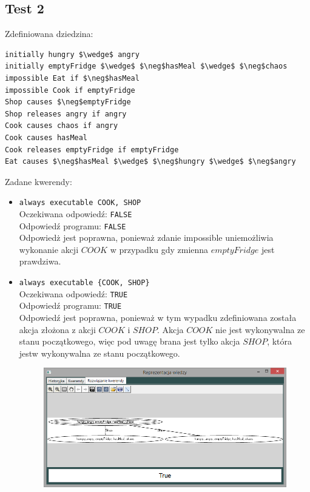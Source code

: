\documentclass{article}
\begin{document}
\subsection{Test 2}
Zdefiniowana dziedzina:
\bigskip
{}
\begin{lstlisting}[mathescape=true]
initially hungry $\wedge$ angry
initially emptyFridge $\wedge$ $\neg$hasMeal $\wedge$ $\neg$chaos 
impossible Eat if $\neg$hasMeal 
impossible Cook if emptyFridge
Shop causes $\neg$emptyFridge
Shop releases angry if angry
Cook causes chaos if angry
Cook causes hasMeal 
Cook releases emptyFridge if emptyFridge
Eat causes $\neg$hasMeal $\wedge$ $\neg$hungry $\wedge$ $\neg$angry
\end{lstlisting}
\vspace{1cm}
Zadane kwerendy:
\begin{itemize}
    \item {\large\texttt{always executable COOK, SHOP}}\\
    Oczekiwana odpowiedź: \texttt{FALSE}\\
    Odpowiedź programu: \texttt{FALSE}\\
    Odpowiedż jest poprawna, ponieważ zdanie impossible uniemożliwia wykonanie akcji $COOK$ w przypadku gdy zmienna $emptyFridge$ jest prawdziwa.
    \item {\large\texttt{always executable \{COOK, SHOP\}}}\\
    Oczekiwana odpowiedź: \texttt{TRUE}\\
    Odpowiedź programu: \texttt{TRUE}\\
    Odpowiedź jest poprawna, ponieważ w tym wypadku zdefiniowana została akcja złożona z akcji $COOK$ i $SHOP$. Akcja $COOK$ nie jest wykonywalna ze stanu początkowego, więc pod uwagę brana jest tylko akcja $SHOP$, która jestw wykonywalna ze stanu początkowego. 
    \begin{figure}[H]
    \centering
    \includegraphics[scale=0.5]{test2_2}

\end{figure}
\end{itemize}
\end{document}
